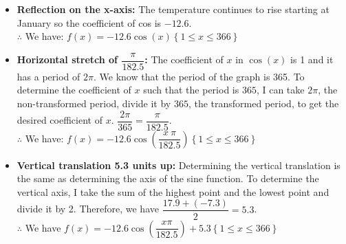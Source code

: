 \documentclass[12pt]{book}
\begin{document}
\begin{enumerate}
\begin{itemize}
  \item \textbf{Reflection on the x-axis:} The temperature continues to rise starting at January so the coefficient of cos is $-12.6$.\\
  $\therefore$ We have: $f(x) = -12.6\cos(x) \left\{1\le x\le 366\right\}$
  
  \item \textbf{Horizontal stretch of $\dfrac{\pi}{182.5}$:} The coefficient of $x$ in $\cos(x)$ is 1 and it has a period of $2\pi$. We know that the period of the graph is 365. To determine the coefficient of $x$ such that the period is $365$, I can take $2\pi$, the non-transformed period, divide it by $365$, the transformed period, to get the desired coefficient of $x$. $\dfrac{2\pi}{365} = \dfrac{\pi}{182.5}$.\\
  $\therefore$ We have: $f\left(x\right)=-12.6\cos\left(\dfrac{x\ \pi}{182.5}\right) \left\{1\le x\le 366\right\}$
  
  \item \textbf{Vertical translation 5.3 units up:} Determining the vertical translation is the same as determining the axis of the sine function. To determine the vertical axis, I take the sum of the highest point and the lowest point and divide it by 2. Therefore, we have $\dfrac{17.9+(-7.3)}{2} = 5.3$.\\
  $\therefore$ We have $f\left(x\right)=-12.6\cos\left(\dfrac{x \pi}{182.5}\right)+5.3 \left\{1\le x\le 366\right\}$
  

\end{itemize}
\end{enumerate}
\end{document}
